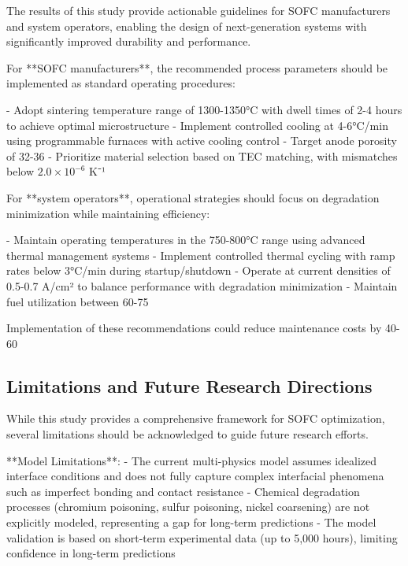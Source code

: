 \documentclass[10pt,conference]{IEEEtran}
\begin{document}
The results of this study provide actionable guidelines for SOFC manufacturers and system operators, enabling the design of next-generation systems with significantly improved durability and performance.

For **SOFC manufacturers**, the recommended process parameters should be implemented as standard operating procedures:

- Adopt sintering temperature range of 1300-1350°C with dwell times of 2-4 hours to achieve optimal microstructure
- Implement controlled cooling at 4-6°C/min using programmable furnaces with active cooling control
- Target anode porosity of 32-36%
- Prioritize material selection based on TEC matching, with mismatches below $2.0 \times 10^{-6}$ K⁻¹

For **system operators**, operational strategies should focus on degradation minimization while maintaining efficiency:

- Maintain operating temperatures in the 750-800°C range using advanced thermal management systems
- Implement controlled thermal cycling with ramp rates below 3°C/min during startup/shutdown
- Operate at current densities of 0.5-0.7 A/cm² to balance performance with degradation minimization
- Maintain fuel utilization between 60-75%

Implementation of these recommendations could reduce maintenance costs by 40-60%

\subsection{Limitations and Future Research Directions}

While this study provides a comprehensive framework for SOFC optimization, several limitations should be acknowledged to guide future research efforts.

**Model Limitations**:
- The current multi-physics model assumes idealized interface conditions and does not fully capture complex interfacial phenomena such as imperfect bonding and contact resistance
- Chemical degradation processes (chromium poisoning, sulfur poisoning, nickel coarsening) are not explicitly modeled, representing a gap for long-term predictions
- The model validation is based on short-term experimental data (up to 5,000 hours), limiting confidence in long-term predictions
\end{document}
